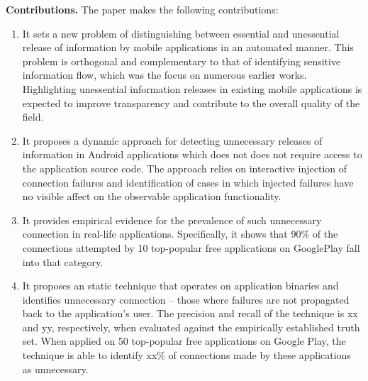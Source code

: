

\vspace{0.1in}
\noindent 
{\bf Contributions.}
The paper makes the following contributions:
\begin{enumerate}
\item It sets a new problem of distinguishing between essential and unessential release of information by mobile applications in an automated manner. This problem is orthogonal and complementary to that of identifying sensitive information flow, which was the focus on numerous earlier works. 
Highlighting unessential information releases in existing mobile applications is expected to improve transparency and contribute to the overall quality of the field. 
\item It proposes a dynamic approach for detecting unnecessary releases of information in Android applications which does not 
does not require access to the application source code. 
The approach relies on interactive injection of connection failures and identification of cases in which injected failures have no visible affect on the observable application functionality. 
\item It provides empirical evidence for the prevalence of such unnecessary connection in real-life applications. Specifically, it shows that 90\% of the connections attempted by 10 top-popular free applications on GooglePlay fall into that category.    
\item It proposes an static technique that operates on application binaries and identifies unnecessary connection -- those where failures are not propagated back to the application's user. The precision and recall of the technique is xx and yy, respectively, when evaluated against the empirically established truth set. 
When applied on 50 top-popular free applications on Google Play, the technique is able to identify xx\% of connections made by these applications as unnecessary.
\end{enumerate}

